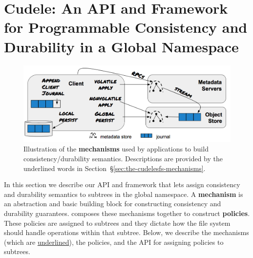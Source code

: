 \section{Cudele: An API and Framework for Programmable Consistency and Durability in a Global Namespace}
\label{sec:methodology-decoupled-namespaces}

\begin{figure}[tb]
\centering
\includegraphics[width=1.0\linewidth]{./chapters/cudele/figures/fig-decouple.png}
\caption{Illustration of the \textbf{mechanisms} used by applications to build
consistency/durability semantics. Descriptions are provided by the
underlined words in Section~\S\ref{sec:the-cudelesfs-mechanisms}.
}\label{fig:decouple}
\end{figure}


In this section we describe our API and framework that lets
 assign consistency and durability
semantics to subtrees in the global namespace. A \textbf{mechanism} is an
abstraction and basic building block for constructing consistency and
durability guarantees.  composes these mechanisms together to
construct \textbf{policies}.  These policies are assigned to subtrees and they
dictate how the file system should handle operations within that subtree.
Below, we describe the mechanisms (which are \underline{underlined}), the
policies, and the API for assigning policies to subtrees.


